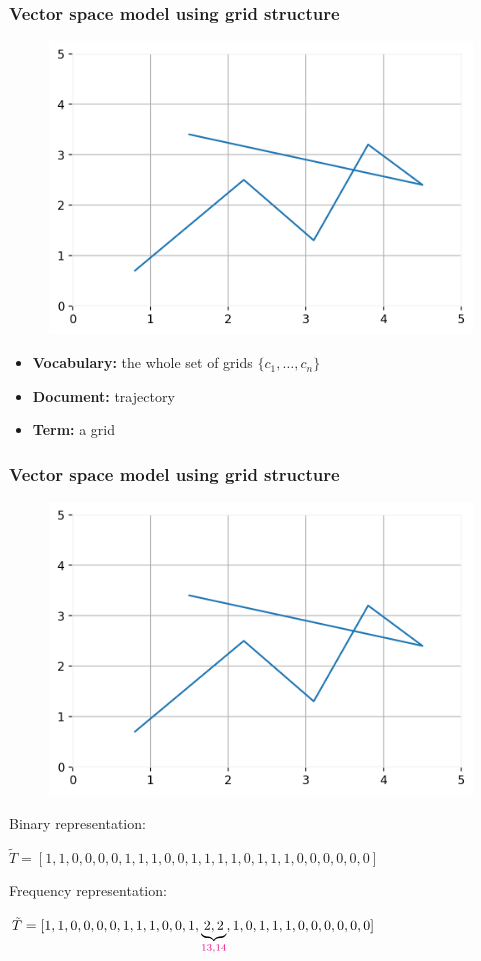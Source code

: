 \documentclass{beamer}
\begin{document}
\begin{frame}
\frametitle{Vector space model using grid structure}  \vspace{-9mm}
\begin{block}{} 
\begin{figure}[h] 
\includegraphics[width=0.6 \textwidth]{grid} 
\end{figure}  \vspace{-3mm} \pause

\begin{itemize}
\item {\bf Vocabulary:} the whole set of grids $\{c_1, \ldots, c_n\}$
\item {\bf Document:} trajectory
\item {\bf Term:} a grid
\end{itemize}
\end{block}
\end{frame}



\begin{frame}
\frametitle{Vector space model using grid structure}  \vspace{-9mm}
\begin{block}{} 
\begin{figure}[h] 
\includegraphics[width=0.6 \textwidth]{grid} 
\end{figure}  \vspace{-4mm} 

{\color{blue} Binary representation:} 

$\tilde{T} = [1,1,0,0,0,0,1,1,1,0,0,1,1,1,1,0,1,1,1,0,0,0,0,0,0]$  \vspace{1mm} \pause

{\color{blue} Frequency representation:} 

$\tilde{T}= [1,1,0,0,0,0,1,1,1,0,0,1, \underbrace{2, 2}_{\color{magenta} 13, 14},1,0,1,1,1,0,0,0,0,0,0]$
\end{block}
\end{frame}
\end{document}
